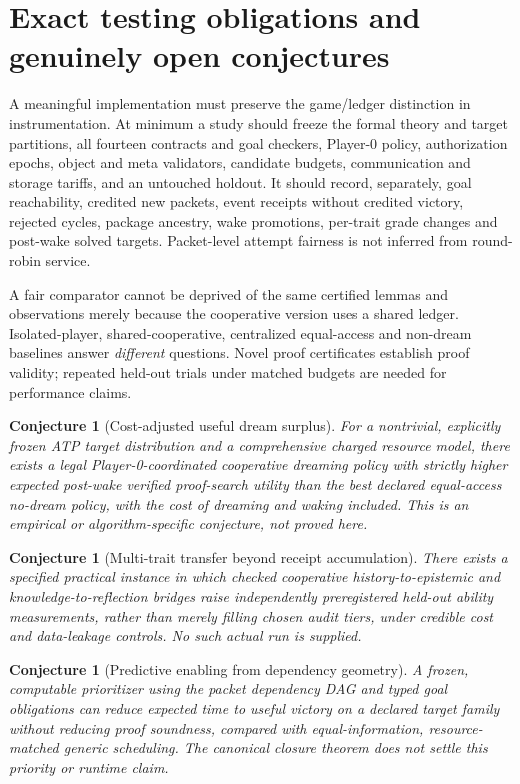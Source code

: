 \documentclass[11pt,letterpaper]{article}
\newtheorem{conjecture}[theorem]{Conjecture}
\begin{document}
\section{Exact testing obligations and genuinely open conjectures}\label{gl-first-W1-s10}
A meaningful implementation must preserve the game/ledger distinction in instrumentation. At minimum a study should freeze the formal theory and target partitions, all fourteen contracts and goal checkers, Player-0 policy, authorization epochs, object and meta validators, candidate budgets, communication and storage tariffs, and an untouched holdout. It should record, separately, goal reachability, credited new packets, event receipts without credited victory, rejected cycles, package ancestry, wake promotions, per-trait grade changes and post-wake solved targets. Packet-level attempt fairness is not inferred from round-robin service.

A fair comparator cannot be deprived of the same certified lemmas and observations merely because the cooperative version uses a shared ledger. Isolated-player, shared-cooperative, centralized equal-access and non-dream baselines answer \emph{different} questions. Novel proof certificates establish proof validity; repeated held-out trials under matched budgets are needed for performance claims.

\begin{conjecture}[Cost-adjusted useful dream surplus]
For a nontrivial, explicitly frozen ATP target distribution and a comprehensive charged resource model, there exists a legal Player-0-coordinated cooperative dreaming policy with strictly higher expected post-wake verified proof-search utility than the best declared equal-access no-dream policy, with the cost of dreaming and waking included. This is an empirical or algorithm-specific conjecture, not proved here.
\end{conjecture}
\begin{conjecture}[Multi-trait transfer beyond receipt accumulation]
There exists a specified practical instance in which checked cooperative history-to-epistemic and knowledge-to-reflection bridges raise independently preregistered held-out ability measurements, rather than merely filling chosen audit tiers, under credible cost and data-leakage controls. No such actual run is supplied.
\end{conjecture}
\begin{conjecture}[Predictive enabling from dependency geometry]
A frozen, computable prioritizer using the packet dependency DAG and typed goal obligations can reduce expected time to \emph{useful} victory on a declared target family without reducing proof soundness, compared with equal-information, resource-matched generic scheduling. The canonical closure theorem does not settle this priority or runtime claim.
\end{conjecture}
\end{document}
